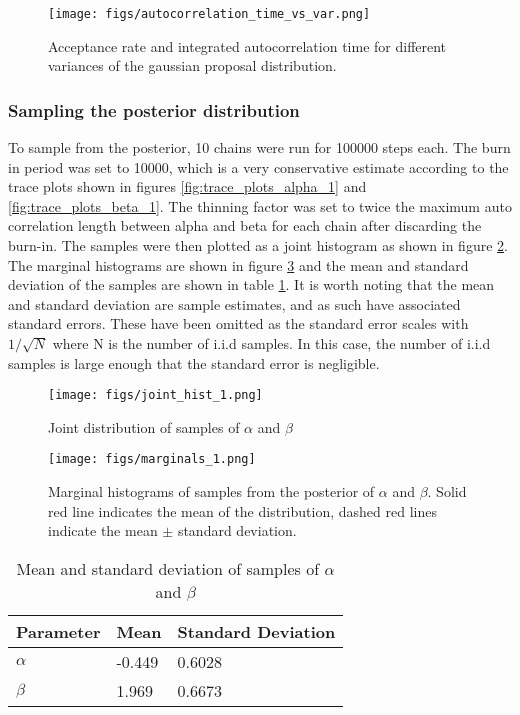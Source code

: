 \documentclass[11pt]{article}
\begin{document}
\begin{figure}[H]
    \centering
    \texttt{[image: figs/autocorrelation\_time\_vs\_var.png]}
    \caption{Acceptance rate and integrated autocorrelation time for different variances of the gaussian proposal distribution.}
    \label{fig:std_tuning}
\end{figure}

\subsubsection{Sampling the posterior distribution}
To sample from the posterior, 10 chains were run for 100000 steps each. The burn in period was set to 10000, which is a very conservative estimate according to the trace plots shown in figures \ref{fig:trace_plots_alpha_1} and \ref{fig:trace_plots_beta_1}. The thinning factor was set to twice the maximum auto correlation length between alpha and beta for each chain after discarding the burn-in. The samples were then plotted as a joint histogram as shown in figure \ref{fig:joint_hist_1}. The marginal histograms are shown in figure \ref{fig:marginal_hist} and the mean and standard deviation of the samples are shown in table \ref{tab:mean_std}. It is worth noting that the mean and standard deviation are sample estimates, and as such have associated standard errors. These have been omitted as the standard error scales with $1/\sqrt{N}$ where N is the number of i.i.d samples. In this case, the number of i.i.d samples is large enough that the standard error is negligible.

\begin{figure}[H]
    \centering
    \texttt{[image: figs/joint\_hist\_1.png]}
    \caption{Joint distribution of samples of $\alpha$ and $\beta$}
    \label{fig:joint_hist_1}
\end{figure}

\begin{figure}[H]
    \centering
    \texttt{[image: figs/marginals\_1.png]}
    \caption{Marginal histograms of samples from the posterior of $\alpha$ and $\beta$. Solid red line indicates the mean of the distribution, dashed red lines indicate the mean $\pm$ standard deviation.}
    \label{fig:marginal_hist}
\end{figure}

\begin{table}[H]
    \centering
    \begin{tabular}{@{}lll@{}}
    \toprule
    Parameter & Mean & Standard Deviation \\ \midrule
    $\alpha$  & -0.449 & 0.6028 \\
    $\beta$   & 1.969 & 0.6673 \\ \bottomrule
    \end{tabular}
    \caption{Mean and standard deviation of samples of $\alpha$ and $\beta$}
    \label{tab:mean_std}
\end{table}
\end{document}
